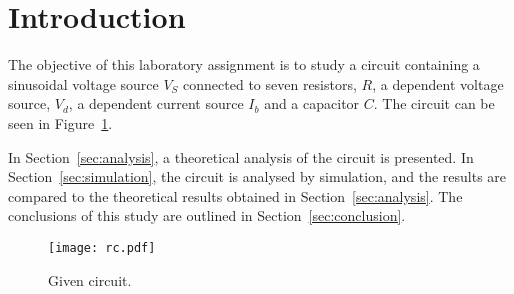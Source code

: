 \section{Introduction}
\label{sec:introduction}

The objective of this laboratory assignment is to study a circuit containing a
sinusoidal voltage source $V_S$ connected to seven resistors, $R$, a dependent voltage source, $V_d$, a dependent current source $I_b$ and a capacitor $C$. The circuit can be seen in Figure~\ref{fig:rc}.

In Section~\ref{sec:analysis}, a theoretical analysis of the circuit is
presented. In Section~\ref{sec:simulation}, the circuit is analysed by
simulation, and the results are compared to the theoretical results obtained in
Section~\ref{sec:analysis}. The conclusions of this study are outlined in
Section~\ref{sec:conclusion}.

\begin{figure}[h] \centering
\texttt{[image: rc.pdf]}
\caption{Given circuit.}
\label{fig:rc}
\end{figure}

